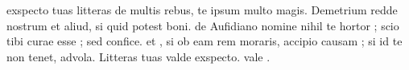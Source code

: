 


exspecto tuas litteras de multis rebus, te ipsum multo magis.  Demetrium redde nostrum et aliud, si quid potest boni. de Aufidiano nomine nihil te hortor ; scio tibi
curae esse ; sed confice. et , si ob eam rem moraris, accipio causam ; si id te non tenet, advola.  Litteras tuas valde exspecto. vale .

